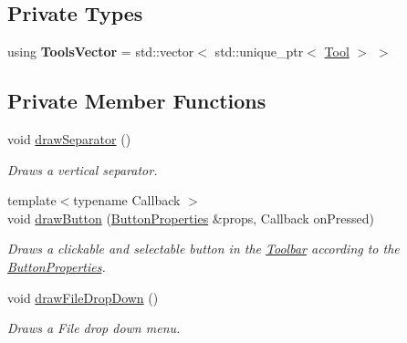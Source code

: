 \subsection*{Private Types}
\begin{DoxyCompactItemize}
\item 
\mbox{\label{classpepr3d_1_1_toolbar_a7d84a6ca9d9aad7afe53b7aecb1fdddf}} 
using {\bfseries Tools\+Vector} = std\+::vector$<$ std\+::unique\+\_\+ptr$<$ \mbox{\hyperlink{classpepr3d_1_1_tool}{Tool}} $>$ $>$
\end{DoxyCompactItemize}
\subsection*{Private Member Functions}
\begin{DoxyCompactItemize}
\item 
\mbox{\label{classpepr3d_1_1_toolbar_a1d55b21ed7022216756d4d156c8f1e52}} 
void \mbox{\hyperlink{classpepr3d_1_1_toolbar_a1d55b21ed7022216756d4d156c8f1e52}{draw\+Separator}} ()
\begin{DoxyCompactList}\small\item\em Draws a vertical separator. \end{DoxyCompactList}\item 
\mbox{\label{classpepr3d_1_1_toolbar_a8ec26251465c349def3cb032370bdf25}} 
{\footnotesize template$<$typename Callback $>$ }\\void \mbox{\hyperlink{classpepr3d_1_1_toolbar_a8ec26251465c349def3cb032370bdf25}{draw\+Button}} (\mbox{\hyperlink{structpepr3d_1_1_toolbar_1_1_button_properties}{Button\+Properties}} \&props, Callback on\+Pressed)
\begin{DoxyCompactList}\small\item\em Draws a clickable and selectable button in the \mbox{\hyperlink{classpepr3d_1_1_toolbar}{Toolbar}} according to the \mbox{\hyperlink{structpepr3d_1_1_toolbar_1_1_button_properties}{Button\+Properties}}. \end{DoxyCompactList}\item 
\mbox{\label{classpepr3d_1_1_toolbar_aceb99e5459d3b1ba1d557caeec2e57d1}} 
void \mbox{\hyperlink{classpepr3d_1_1_toolbar_aceb99e5459d3b1ba1d557caeec2e57d1}{draw\+File\+Drop\+Down}} ()
\begin{DoxyCompactList}\small\item\em Draws a File drop down menu. \end{DoxyCompactList}\item 

\end{DoxyCompactItemize}
